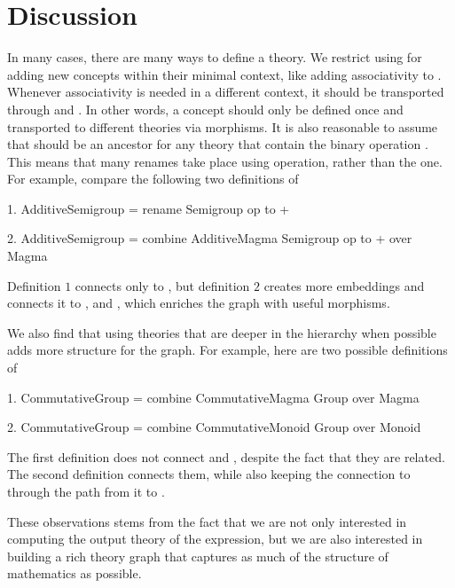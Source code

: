 \section{Discussion}
\label{sec:library:discussion}
In many cases, there are many ways to define a theory. We restrict using  for adding new concepts within their minimal context, like adding associativity to . Whenever associativity is needed in a different context, it should be transported through  and . In other words, a concept should only be defined once and transported to different theories via morphisms. It is also reasonable to assume that  should be an ancestor for any theory that contain the binary {operation \lstmath{+}}. This means that many renames take place using  operation, rather than the  one. For example, compare the following two definitions of  
\begin{togcode}
1. AdditiveSemigroup = rename Semigroup {op to +}
\end{togcode}
\begin{togcode}
2. AdditiveSemigroup = 
       combine AdditiveMagma {} Semigroup {op to +} over Magma 
\end{togcode}
Definition $1$ connects  only to , but definition $2$ creates more embeddings and connects it to ,  and , which enriches the graph with useful morphisms. 

We also find that using theories that are deeper in the hierarchy when possible adds more structure for the graph. For example, here are two possible definitions of    
\begin{togcode} 
1. CommutativeGroup = 
       combine CommutativeMagma {} Group {} over Magma
\end{togcode} 
\begin{togcode}
2. CommutativeGroup = 
       combine CommutativeMonoid {} Group {} over Monoid
\end{togcode}
The first definition does not connect  and , despite the fact that they are related. The second definition connects them, while also keeping the connection to  through the path from it to . 

These observations stems from the fact that we are not only interested in computing the output theory of the expression, but we are also interested in building a rich theory graph that captures as much of the structure of mathematics as possible. 


